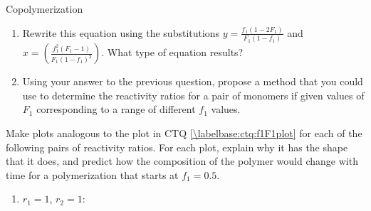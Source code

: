 \begin{activity}{Copolymerization}
\begin{ctqs}
		\begin{enumerate}
			\item Rewrite this equation using the substitutions $y=\frac{f_1(1-2F_1)}{F_1(1-f_1)}$ and $x=\left(\frac{f_1^2(F_1-1)}{F_1(1-f_1)^2}\right)$.  What type of equation results?
			
				\begin{solution}[1in]\end{solution}
			
			\item Using your answer to the previous question, propose a method that you could use to determine the reactivity ratios for a pair of monomers if given values of $F_1$ corresponding to a range of different $f_1$ values.
			
				\begin{solution}[2in]\end{solution}
		\end{enumerate}
\end{ctqs}


\begin{exercises}

	\exercise Make plots analogous to the plot in CTQ \ref{\labelbase:ctq:f1F1plot} for each of the following pairs of reactivity ratios.  For each plot, explain why it has the shape that it does, and predict how the composition of the polymer would change with time for a polymerization that starts at $f_1=0.5$.
	
		\begin{enumerate}
			\item $r_1=1$, $r_2=1$:
	
				\begin{solution}
\end{solution}
\end{enumerate}
\end{exercises}
\end{activity}
